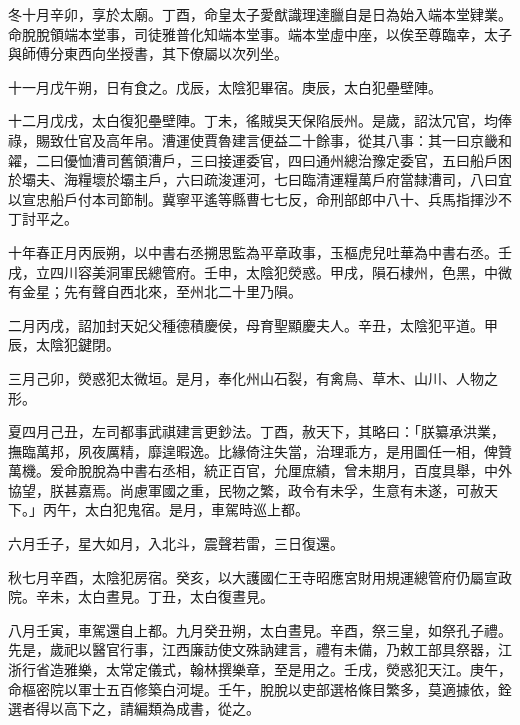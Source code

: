 \begin{pinyinscope}
 冬十月辛卯，享於太廟。丁酉，命皇太子愛猷識理達臘自是日為始入端本堂肄業。命脫脫領端本堂事，司徒雅普化知端本堂事。端本堂虛中座，以俟至尊臨幸，太子與師傅分東西向坐授書，其下僚屬以次列坐。



 十一月戊午朔，日有食之。戊辰，太陰犯畢宿。庚辰，太白犯壘壁陣。



 十二月戊戌，太白復犯壘壁陣。丁未，徭賊吳天保陷辰州。是歲，詔汰冗官，均俸祿，賜致仕官及高年帛。漕運使賈魯建言便益二十餘事，從其八事：其一曰京畿和糴，二曰優恤漕司舊領漕戶，三曰接運委官，四曰通州總治豫定委官，五曰船戶困於壩夫、海糧壞於壩主戶，六曰疏浚運河，七曰臨清運糧萬戶府當隸漕司，八曰宜以宣忠船戶付本司節制。冀寧平遙等縣曹七七反，命刑部郎中八十、兵馬指揮沙不丁討平之。



 十年春正月丙辰朔，以中書右丞搠思監為平章政事，玉樞虎兒吐華為中書右丞。壬戌，立四川容美洞軍民總管府。壬申，太陰犯熒惑。甲戌，隕石棣州，色黑，中微有金星；先有聲自西北來，至州北二十里乃隕。



 二月丙戌，詔加封天妃父種德積慶侯，母育聖顯慶夫人。辛丑，太陰犯平道。甲辰，太陰犯鍵閉。



 三月己卯，熒惑犯太微垣。是月，奉化州山石裂，有禽鳥、草木、山川、人物之形。



 夏四月己丑，左司都事武祺建言更鈔法。丁酉，赦天下，其略曰：「朕纂承洪業，撫臨萬邦，夙夜厲精，靡遑暇逸。比緣倚注失當，治理乖方，是用圖任一相，俾贊萬機。爰命脫脫為中書右丞相，統正百官，允厘庶績，曾未期月，百度具舉，中外協望，朕甚嘉焉。尚慮軍國之重，民物之繁，政令有未孚，生意有未遂，可赦天下。」丙午，太白犯鬼宿。是月，車駕時巡上都。



 六月壬子，星大如月，入北斗，震聲若雷，三日復還。



 秋七月辛酉，太陰犯房宿。癸亥，以大護國仁王寺昭應宮財用規運總管府仍屬宣政院。辛未，太白晝見。丁丑，太白復晝見。



 八月壬寅，車駕還自上都。九月癸丑朔，太白晝見。辛酉，祭三皇，如祭孔子禮。先是，歲祀以醫官行事，江西廉訪使文殊訥建言，禮有未備，乃敕工部具祭器，江浙行省造雅樂，太常定儀式，翰林撰樂章，至是用之。壬戌，熒惑犯天江。庚午，命樞密院以軍士五百修築白河堤。壬午，脫脫以吏部選格條目繁多，莫適據依，銓選者得以高下之，請編類為成書，從之。




\end{pinyinscope}
